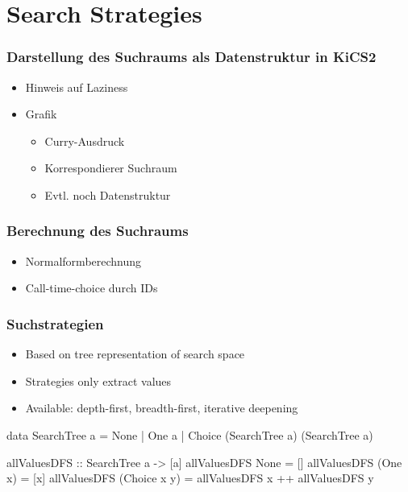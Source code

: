 \documentclass[
,hyperref={pdfpagelabels=false}
]{beamer}
\begin{document}
\section{Search Strategies}

\begin{frame}[fragile]%
\frametitle{Darstellung des Suchraums als Datenstruktur in KiCS2}
\begin{itemize}
\item Hinweis auf Laziness
\item Grafik
  \begin{itemize}
  \item Curry-Ausdruck
  \item Korrespondierer Suchraum
  \item Evtl. noch Datenstruktur
  \end{itemize}
\end{itemize}
\end{frame}

\begin{frame}[fragile]%
\frametitle{Berechnung des Suchraums}
\begin{itemize}
\item Normalformberechnung
\item Call-time-choice durch IDs
\end{itemize}
\end{frame}

\begin{frame}[fragile]%
\frametitle{Suchstrategien}

\begin{itemize}
  \item Based on tree representation of search space
  \item Strategies only extract values
  \item Available: depth-first, breadth-first, iterative deepening
\end{itemize}

\begin{haskell}[SearchTree]
data SearchTree a = None
                  | One a
                  | Choice (SearchTree a) (SearchTree a)
\end{haskell}

\begin{haskell}
allValuesDFS :: SearchTree a -> [a]
allValuesDFS None         = []
allValuesDFS (One      x) = [x]
allValuesDFS (Choice x y) = allValuesDFS x ++ allValuesDFS y
\end{haskell}

\end{frame}
\end{document}
